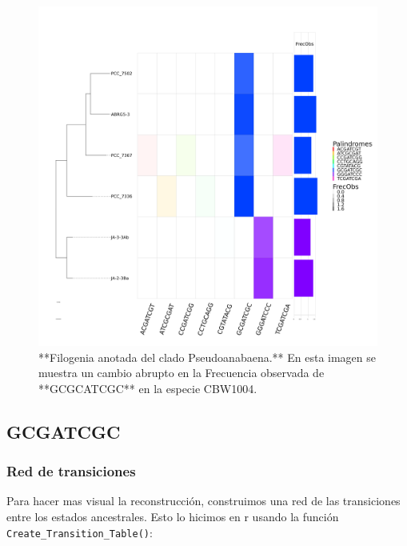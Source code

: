\documentclass[
]{book}
\begin{document}
\begin{figure}

{\centering \includegraphics[width=1\linewidth]{Clados/Pseudoanabaena_clade/figures/pseudoanabaena_Octanuc_FrecObs_sel32_filogenia_HIG} 

}

\caption{**Filogenia anotada del clado Pseudoanabaena.** En esta imagen se muestra un cambio abrupto en la Frecuencia observada de **GCGCATCGC** en la especie CBW1004.}\label{fig:FIG12P}
\end{figure}

\hypertarget{gcgatcgc-3}{%
\subsection{GCGATCGC}\label{gcgatcgc-3}}

\hypertarget{red-de-transiciones-5}{%
\subsubsection{Red de transiciones}\label{red-de-transiciones-5}}

Para hacer mas visual la reconstrucción, construimos una red de las transiciones entre los estados ancestrales. Esto lo hicimos en r usando la función \texttt{Create\_Transition\_Table()}:
\end{document}
